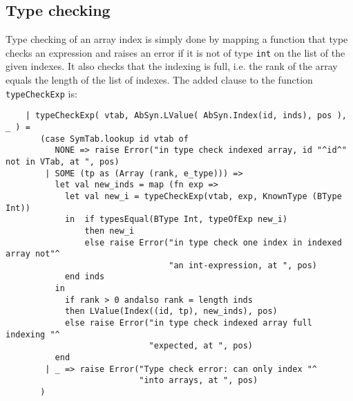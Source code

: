 \documentclass{article}
\begin{document}
\subsection{Type checking}
Type checking of an array index is simply done by mapping a function that type checks an expression and raises an error if it is not of type \texttt{int} on the list of the given indexes. It also checks that the indexing is full, i.e. the rank of the array equals the length of the list of indexes.
The added clause to the function \texttt{typeCheckExp} is:
\begin{lstlisting}
    | typeCheckExp( vtab, AbSyn.LValue( AbSyn.Index(id, inds), pos ), _ ) =
       (case SymTab.lookup id vtab of
          NONE => raise Error("in type check indexed array, id "^id^" not in VTab, at ", pos)
        | SOME (tp as (Array (rank, e_type))) =>
          let val new_inds = map (fn exp =>
            let val new_i = typeCheckExp(vtab, exp, KnownType (BType Int))
            in  if typesEqual(BType Int, typeOfExp new_i)
                then new_i
                else raise Error("in type check one index in indexed array not"^
                                 "an int-expression, at ", pos)
            end inds
          in
            if rank > 0 andalso rank = length inds
            then LValue(Index((id, tp), new_inds), pos)
            else raise Error("in type check indexed array full indexing "^
                             "expected, at ", pos)
          end
        | _ => raise Error("Type check error: can only index "^
                           "into arrays, at ", pos)
       )
\end{lstlisting}
\end{document}
